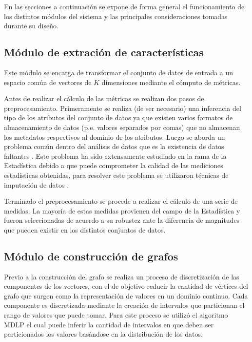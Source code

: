 En las secciones a continuaci\'on se expone de forma general el funcionamiento de los distintos m\'odulos
del sistema y las principales consideraciones tomadas durante su dise\~no.

\subsection{M\'odulo de extraci\'on de caracter\'isticas}

Este m\'odulo se encarga de transformar el conjunto de datos de entrada a un
espacio com\'un de vectores de $K$ dimensiones mediante el c\'omputo de m\'etricas. 

Antes de realizar el c\'alculo de las m\'etricas se realizan dos pasos de preprocesamiento.
Primeramente se realiza (de ser necesario) una inferencia del tipo de los atributos del conjunto de datos ya que existen
varios formatos de almacenamiento de datos (p.e. valores separados por comas) que no almacenan los metadatos
respectivos al dominio de los atributos. Luego se aborda un problema com\'un dentro del an\'alisis de datos que
es la existencia de datos faltantes \cite{schafer2002missing}. Este problema ha sido extensamente estudiado en la
rama de la Estad\'istica debido a que puede comprometer la calidad de las mediciones estad\'isticas obtenidas, para
resolver este problema se utilizaron t\'ecnicas de imputaci\'on de datos \cite{jadhav2019comparison}.

Terminado el preprocesamiento se procede a realizar el c\'alculo de una serie de medidas. La mayor\'ia
de estas medidas provienen del campo de la Estad\'istica y fueron seleccionadas de acuerdo a su robustez
ante la diferencia de magnitudes que pueden existir en los distintos conjuntos de datos.

\subsection{M\'odulo de construcci\'on de grafos}

Previo a la construcci\'on del grafo se realiza un proceso
de discretizaci\'on de las componentes de los vectores, con el de objetivo reducir
la cantidad de v\'ertices del grafo que surgen como la representaci\'on de valores en un dominio continuo.
Cada componente es discretizada mediante la creaci\'on de intervalos que particionan el
rango de valores que puede tomar. Para este proceso
se utiliz\'o el algoritmo MDLP \cite{fayyad1993multi} el cual puede
inferir la cantidad de intervalos en que deben ser particionados los valores
bas\'andose en la distribuci\'on de los datos.

